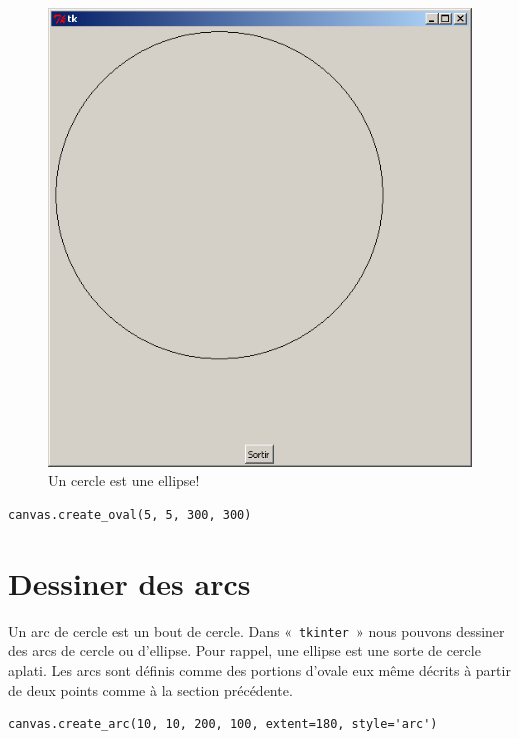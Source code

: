 \begin{figure}[h!]
\centering
\includegraphics[scale=0.4]{images/cerclebis}
\caption{Un cercle est une ellipse!}\label{fig:cerclebis}
\end{figure}

\begin{Verbatim}[frame=single,rulecolor=\color{mbleu}, label=à taper]
canvas.create_oval(5, 5, 300, 300)
\end{Verbatim}

\section{Dessiner des arcs}
Un arc de cercle est un bout de cercle. Dans «~\texttt{tkinter}~» nous pouvons dessiner des arcs de cercle ou d'ellipse. Pour rappel, une ellipse est une sorte de cercle aplati. 
Les arcs sont définis comme des portions d'ovale eux même décrits à partir de deux points comme à la section précédente.

\begin{Verbatim}[frame=single,rulecolor=\color{mbleu}, label=à taper]
canvas.create_arc(10, 10, 200, 100, extent=180, style='arc')
\end{Verbatim}



